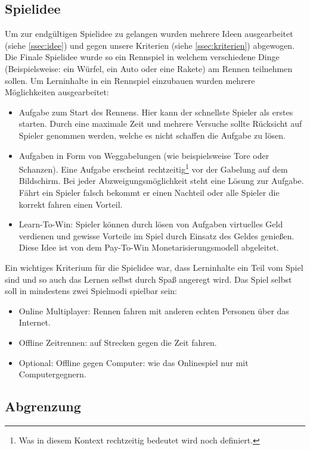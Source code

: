 \subsection{Spielidee}
	Um zur endgültigen Spielidee zu gelangen wurden mehrere Ideen ausgearbeitet (siehe \ref{ssec:idee}) und gegen unsere Kriterien (siehe \ref{ssec:kriterien}) abgewogen.
	Die Finale Spielidee wurde so ein Rennspiel in welchem verschiedene Dinge (Beispielsweise: ein Würfel, ein Auto oder eine Rakete) am Rennen teilnehmen sollen. Um Lerninhalte in ein Rennspiel einzubauen wurden mehrere Möglichkeiten ausgearbeitet:
	\begin{itemize}
		\item{ Aufgabe zum Start des Rennens. Hier kann der schnellste Spieler als erstes starten. Durch eine maximale Zeit und mehrere Versuche sollte Rücksicht auf Spieler genommen werden, welche es nicht schaffen die Aufgabe zu lösen. }
		\item{ Aufgaben in Form von Weggabelungen (wie beispielsweise Tore oder Schanzen). Eine Aufgabe erscheint rechtzeitig\footnote{Was in diesem Kontext rechtzeitig bedeutet wird noch definiert.} vor der Gabelung auf dem Bildschirm. Bei jeder Abzweigungsmöglichkeit steht eine Lösung zur Aufgabe. Fährt ein Spieler falsch  bekommt er einen Nachteil oder alle Spieler die korrekt fahren einen Vorteil. }
		\item{ Learn-To-Win: Spieler können durch lösen von Aufgaben virtuelles Geld verdienen und gewisse Vorteile im Spiel durch Einsatz des Geldes genießen. Diese Idee ist von dem Pay-To-Win Monetarisierungsmodell abgeleitet. }
	\end{itemize}
	Ein wichtiges Kriterium für die Spielidee war, dass Lerninhalte ein Teil vom Spiel sind und so auch das Lernen selbst durch Spaß angeregt wird.
	Das Spiel selbst soll in mindestens zwei Spielmodi spielbar sein:
	\begin{itemize}
		\item{ Online Multiplayer: Rennen fahren mit anderen echten Personen über das Internet. }
		\item{ Offline Zeitrennen: auf Strecken gegen die Zeit fahren. }
		\item{ Optional: Offline gegen Computer: wie das Onlinespiel nur mit Computergegnern. }
	\end{itemize}

\subsection{Abgrenzung}
